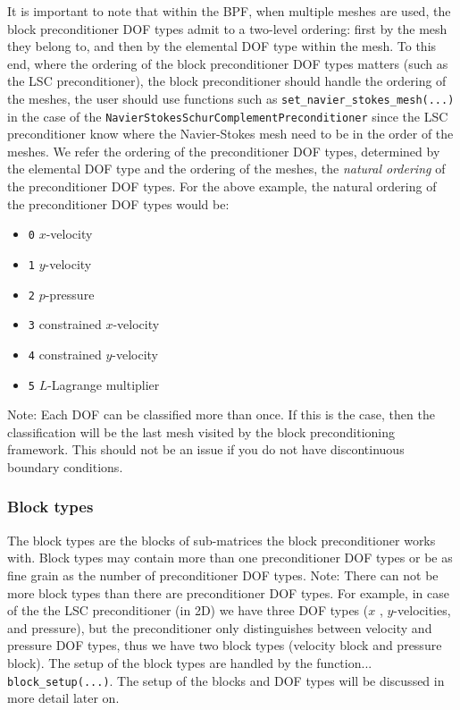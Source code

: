 It is important to note that within the BPF, when multiple meshes are used, the
block preconditioner DOF types admit to a two-level ordering: first by the mesh 
they belong to, and then by the elemental DOF type within the mesh. To this end, 
where the ordering of the block preconditioner DOF types matters (such as the 
LSC preconditioner), the block preconditioner should handle the ordering of the 
meshes, the user should use functions such as 
\texttt{set\_\allowbreak navier\_\allowbreak stokes\_\allowbreak mesh(...)}
in the case of the 
\texttt{Navier\allowbreak Stokes\allowbreak Schur\allowbreak Complement\allowbreak Preconditioner} 
since the LSC preconditioner know where the Navier-Stokes mesh need to be in 
the order of the meshes. We refer the ordering of the preconditioner DOF types, 
determined by the elemental DOF type and the ordering of the meshes, the 
\emph{natural ordering} of the preconditioner DOF types. For the above example, the natural ordering of the preconditioner DOF
types would be:
\begin{itemize}
 \item \verb+0+ $x$-velocity
 \item \verb+1+ $y$-velocity
 \item \verb+2+ $p$-pressure
 \item \verb+3+ constrained $x$-velocity
 \item \verb+4+ constrained $y$-velocity
 \item \verb+5+ $L$-Lagrange multiplier
\end{itemize}

Note: Each DOF can be classified more than once. If this is the case, then the classification will be the last mesh visited by the block preconditioning framework. This should not be an issue if you do not have discontinuous boundary conditions.

\subsubsection{Block types}
The block types are the blocks of sub-matrices the block preconditioner works with. Block types may contain more than one preconditioner DOF types or be as fine grain as the number of preconditioner DOF types. Note: There can not be more block types than there are preconditioner DOF types. For example, in case of the the LSC preconditioner (in 2D) we have three DOF types ($x$ , $y$-velocities, and pressure), but the preconditioner only distinguishes between velocity and pressure DOF types, thus we have two block types (velocity block and pressure block). The setup of the block types are handled by the function... \verb+block_setup(...)+. The setup of the blocks and DOF types will be discussed in more detail later on.


